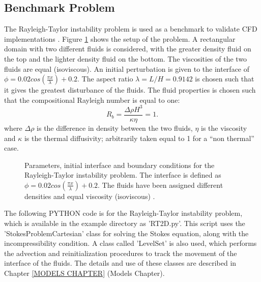 \subsection{Benchmark Problem}

The Rayleigh-Taylor instability problem is used as a benchmark to validate CFD implementations \cite{VANKEKEN1997}. Figure \ref{RT2DSETUP} shows the setup of the problem. A rectangular domain with two different fluids is considered, with the greater density fluid on the top and the lighter density fluid on the bottom. The viscosities of the two fluids are equal (isoviscous). An initial perturbation is given to the interface of $\phi=0.02cos(\frac{\pi x}{\lambda}) + 0.2$. The aspect ratio $\lambda = L/H = 0.9142$ is chosen such that it gives the greatest disturbance of the fluids. The fluid properties is chosen such that the compositional Rayleigh number is equal to one:
%
\begin{equation}
R_{b} = \frac{\Delta \rho H^{3}}{\kappa \eta} = 1.
\label{RAYLEIGH NUMBER}
\end{equation}
%
where $\Delta \rho$ is the difference in density between the two fluids, $\eta$ is the viscosity and $\kappa$ is the thermal diffusivity; arbitrarily taken equal to 1 for a ``non thermal'' case.
%
%
\begin{figure}
\center
{}
\caption{Parameters, initial interface and boundary conditions for the Rayleigh-Taylor instability problem. The interface is defined as $\phi=0.02cos(\frac{\pi x}{\lambda}) + 0.2$. The fluids have been assigned different densities and equal viscosity (isoviscous) \cite{BOURGOUIN2006}.}
\label{RT2DSETUP}
\end{figure}
%
%
The following PYTHON code is for the Rayleigh-Taylor instability problem, which is available in the example directory as 'RT2D.py'. This script uses the 'StokesProblemCartesian' class for solving the Stokes equation, along with the incompressibility condition. A class called 'LevelSet' is also used, which performs the advection and reinitialization procedures to track the movement of the interface of the fluids. The details and use of these classes are described in Chapter \ref{MODELS CHAPTER} (Models Chapter).

